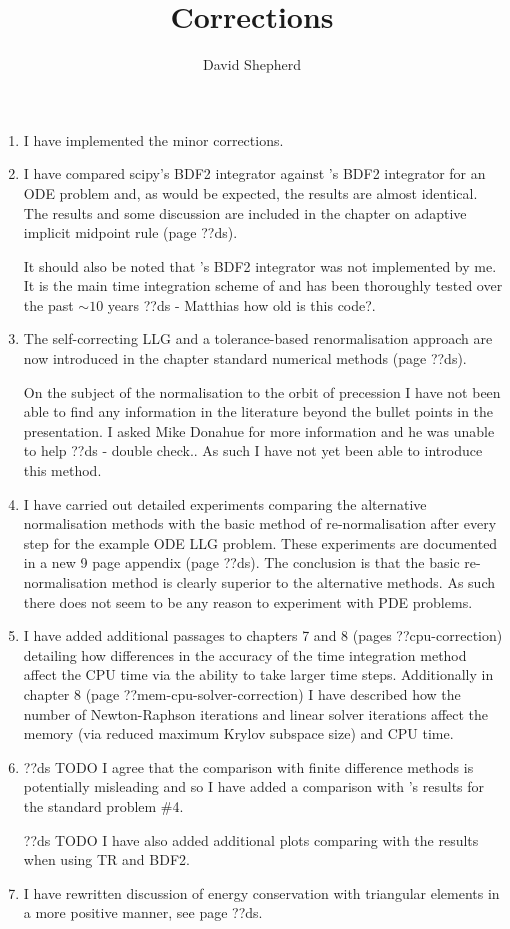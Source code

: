 \documentclass[12pt,a4paper,pdftex]{article}
\title{Corrections}
\author{David Shepherd}
\begin{document}
\maketitle

\begin{enumerate}
\item I have implemented the minor corrections.

\item I have compared scipy's \VODE BDF2 integrator against \oomph's BDF2 integrator for an ODE problem and, as would be expected, the results are almost identical. The results and some discussion are included in the chapter on adaptive implicit midpoint rule (page ??ds).

It should also be noted that \oomph's BDF2 integrator was not implemented by me.
It is the main time integration scheme of \oomph and has been thoroughly tested over the past $\sim 10$ years ??ds - Matthias how old is this code?.

\item The self-correcting LLG and a tolerance-based renormalisation approach are now introduced in the chapter standard numerical methods (page ??ds).

  On the subject of the normalisation to the orbit of precession I have not been able to find any information in the literature beyond the bullet points in the presentation.
I asked Mike Donahue for more information and he was unable to help ??ds - double check..
As such I have not yet been able to introduce this method.

\item I have carried out detailed experiments comparing the alternative normalisation methods with the basic method of re-normalisation after every step for the example ODE LLG problem.
These experiments are documented in a new 9 page appendix (page ??ds).
The conclusion is that the basic re-normalisation method is clearly superior to the alternative methods.
As such there does not seem to be any reason to experiment with PDE problems.

\item I have added additional passages to chapters 7 and 8 (pages ??cpu-correction) detailing how differences in the accuracy of the time integration method affect the CPU time via the ability to take larger time steps.
  Additionally in chapter 8 (page ??mem-cpu-solver-correction) I have described how the number of Newton-Raphson iterations and linear solver iterations affect the memory (via reduced maximum Krylov subspace size) and CPU time.

\item ??ds TODO
I agree that the comparison with finite difference methods is potentially misleading and so I have added a comparison with \nmag's results for the \mumag standard problem \#4.

??ds TODO
I have also added additional plots comparing with the results when using TR and BDF2.

\item I have rewritten discussion of energy conservation with triangular elements in a more positive manner, see page ??ds.

\end{enumerate}
\end{document}
